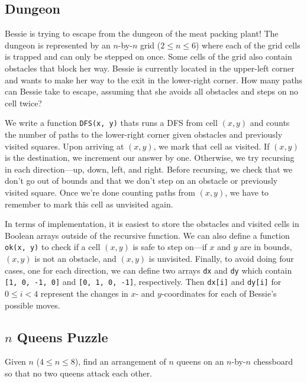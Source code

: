 \subsection{Dungeon}

\begin{typewriter}
  Bessie is trying to escape from the dungeon of the meat packing plant! The dungeon is represented by an $n$-by-$n$ grid ($2 \le n \le 6$) where each of the grid cells is trapped and can only be stepped on once. Some cells of the grid also contain obstacles that block her way. Bessie is currently located in the upper-left corner and wants to make her way to the exit in the lower-right corner. How many paths can Bessie take to escape, assuming that she avoids all obstacles and steps on no cell twice?
\end{typewriter}

We write a function \texttt{DFS(x, y)} thats runs a DFS from cell $(x, y)$ and counts the number of paths to the lower-right corner given obstacles and previously visited squares. Upon arriving at $(x, y)$, we mark that cell as visited. If $(x, y)$ is the destination, we increment our answer by one. Otherwise, we try recursing in each direction---up, down, left, and right. Before recursing, we check that we don't go out of bounds and that we don't step on an obstacle or previously visited square. Once we're done counting paths from $(x, y)$, we have to remember to mark this cell as unvisited again.

In terms of implementation, it is easiest to store the obstacles and visited cells in Boolean arrays outside of the recursive function. We can also define a function \texttt{ok(x, y)} to check if a cell $(x, y)$ is safe to step on---if $x$ and $y$ are in bounds, $(x, y)$ is not an obstacle, and $(x, y)$ is unvisited. Finally, to avoid doing four cases, one for each direction, we can define two arrays \texttt{dx} and \texttt{dy} which contain \texttt{[1, 0, -1, 0]} and \texttt{[0, 1, 0, -1]}, respectively. Then \texttt{dx[i]} and \texttt{dy[i]} for $0 \le i < 4$ represent the changes in $x$- and $y$-coordinates for each of Bessie's possible moves.
\subsection{$n$ Queens Puzzle}

\begin{typewriter}
  Given $n$ ($4 \le n \le 8$), find an arrangement of $n$ queens on an $n$-by-$n$ chessboard so that no two queens attack each other. 
\end{typewriter}

